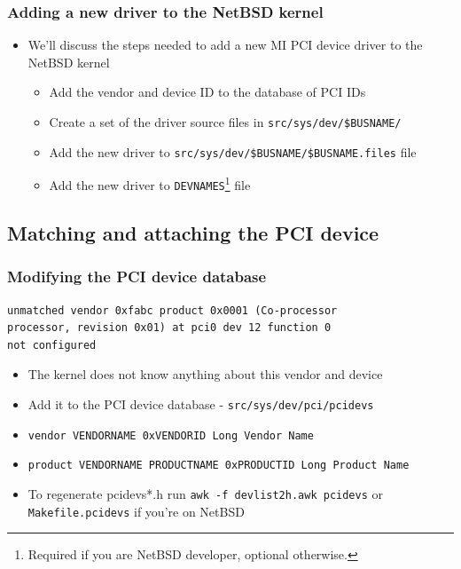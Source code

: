 \documentclass[dvipsnames,table]{beamer}
\begin{document}
\begin{frame}
\frametitle{Adding a new driver to the NetBSD kernel}
\begin{itemize}
	\item We'll discuss the steps needed to add a new MI PCI device driver to the NetBSD kernel
	\begin{itemize}
		\item Add the vendor and device ID to the database of PCI IDs
		\item Create a set of the driver source files in {\tt src/sys/dev/\$BUSNAME/ }
		\item Add the new driver to {\tt src/sys/dev/\$BUSNAME/\$BUSNAME.files} file
		\item Add the new driver to {\tt DEVNAMES}\footnote{Required if you are NetBSD developer, optional otherwise.} file
	\end{itemize}
\end{itemize}
\end{frame}

\subsection{Matching and attaching the PCI device}

\begin{frame}[fragile]
\frametitle{Modifying the PCI device database}
\begin{verbatim}
unmatched vendor 0xfabc product 0x0001 (Co-processor 
processor, revision 0x01) at pci0 dev 12 function 0 
not configured
\end{verbatim}
\begin{itemize}
	\item The kernel does not know anything about this vendor and device
	\item Add it to the PCI device database - {\tt src/sys/dev/pci/pcidevs}
	\item {\tt vendor VENDORNAME 0xVENDORID Long Vendor Name}
	\item {\tt product VENDORNAME PRODUCTNAME 0xPRODUCTID	Long Product Name}
	\item To regenerate pcidevs*.h run {\tt awk -f devlist2h.awk pcidevs} or
{\tt Makefile.pcidevs} if you're on NetBSD
\end{itemize}
\end{frame}
\end{document}
